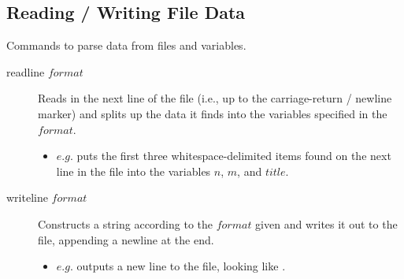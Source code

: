 \subsection{Reading / Writing File Data}
Commands to parse data from files and variables.\\
\begin{description}

	\item[readline $format$\its]
	Reads in the next line of the file (i.e., up to the carriage-return / newline marker) and splits up the data it finds into the variables specified in the $format$.
	\begin{itemize}
		\item $e.g.$  puts the first three whitespace-delimited items found on the next line in the file into the variables $n$, $m$, and $title$.
	\end{itemize}

	\item[writeline $format$\its]
	Constructs a string according to the $format$ given and writes it out to the file, appending a newline at the end.
	\begin{itemize}
		\item $e.g.$  outputs a new line to the file, looking like .
	\end{itemize}

\end{description}


